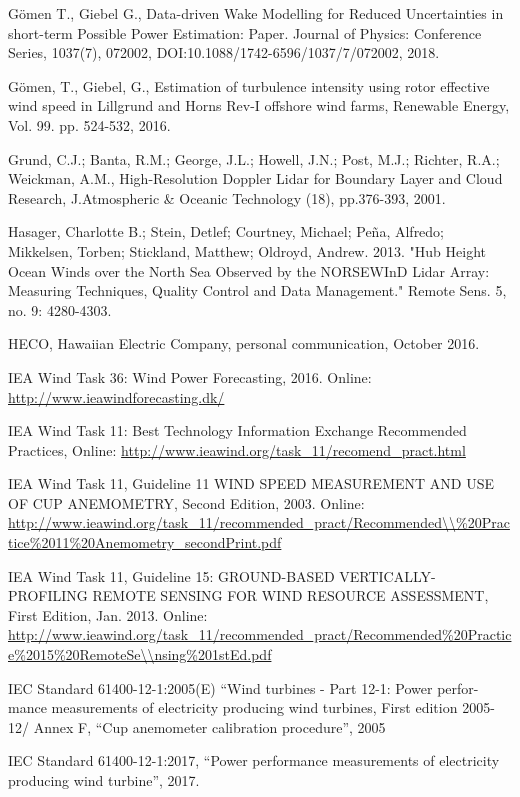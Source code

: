 {G{\"o}{\cc}men T., Giebel G., Data-driven Wake Modelling for Reduced Uncertainties in short-term Possible Power Estimation: Paper. Journal of Physics: Conference Series, 1037(7), 072002, DOI:10.1088/1742-6596/1037/7/072002, 2018.


G{\"o}{\cc}men, T., Giebel, G., Estimation of turbulence intensity using rotor effective wind speed in Lillgrund and Horns Rev-I offshore wind farms, Renewable Energy, Vol. 99. pp. 524-532, 2016.


Grund, C.J.; Banta, R.M.; George, J.L.; Howell, J.N.; Post, M.J.; Richter, R.A.; Weickman, A.M., High-Resolution Doppler Lidar for Boundary Layer and Cloud Research, J.Atmospheric & Oceanic Technology (18), pp.376-393, 2001.


Hasager, Charlotte B.; Stein, Detlef; Courtney, Michael; Peña, Alfredo; Mikkelsen, Torben; Stickland, Matthew; Oldroyd, Andrew. 2013. "Hub Height Ocean Winds over the North Sea Observed by the NORSEWInD Lidar Array: Measuring Techniques, Quality Control and Data Management." Remote Sens. 5, no. 9: 4280-4303.


HECO, Hawaiian Electric Company, personal communication, October 2016.

IEA Wind Task 36: Wind Power Forecasting, 2016. Online: \url{http://www.ieawindforecasting.dk/}


IEA Wind Task 11: Best Technology Information Exchange Recommended Practices, Online: \small{\url{http://www.ieawind.org/task_11/recomend_pract.html}}


IEA Wind Task 11, Guideline 11  WIND SPEED MEASUREMENT AND USE OF CUP ANEMOMETRY, Second Edition, 2003.
Online: \small{\url{http://www.ieawind.org/task_11/recommended_pract/Recommended\\\%20Practice\%2011\%20Anemometry_secondPrint.pdf}}


IEA Wind Task 11, Guideline 15:  GROUND-BASED VERTICALLY-PROFILING REMOTE SENSING FOR WIND RESOURCE ASSESSMENT, First Edition, Jan. 2013.
Online: \small{\url{http://www.ieawind.org/task_11/recommended_pract/Recommended\%20Practice\%2015\%20RemoteSe\\nsing\%201stEd.pdf}}


IEC Standard 61400-12-1:2005(E)   “Wind   turbines   -   Part   12-1:   Power   perfor-mance measurements of electricity producing wind turbines, First edition 2005-12/ Annex F, “Cup anemometer calibration procedure”, 2005


IEC Standard 61400-12-1:2017, “Power performance measurements of electricity producing wind turbine”, 2017.


}
